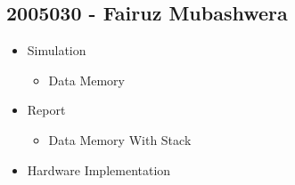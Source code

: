 \documentclass[12]{article}
\begin{document}
\subsection*{2005030 - Fairuz Mubashwera}
\begin{itemize}
    \item Simulation
    \begin{itemize}
        \item Data Memory
    \end{itemize}
    \item Report
    \begin{itemize}
        \item Data Memory With Stack
    \end{itemize}
    \item Hardware Implementation
\end{itemize}
\end{document}
